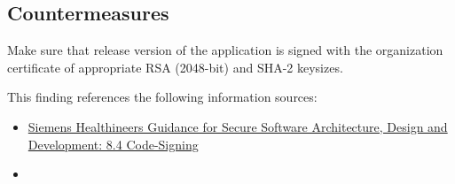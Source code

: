 
\subsection*{Countermeasures}

Make sure that release version of the application is signed with the organization certificate of appropriate RSA (2048-bit)
and SHA-2 keysizes.



This finding references the following information sources:

\begin{itemize}
	\item \href{https://doku-center.med.siemens.de/regelwerke/L4U-Intranet/GD/GD-41/GD-41-03-E.pdf}{Siemens Healthineers Guidance for Secure Software Architecture, Design and
	Development: 8.4 Code-Signing}
	\item {}
\end{itemize}


